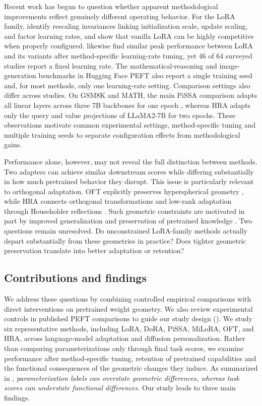 Recent work has begun to question whether apparent methodological improvements
reflect genuinely different operating behavior.
For the LoRA family, \citet{schulman2025lora} identify rescaling invariances
linking initialization scale, update scaling, and factor learning rates, and
show that vanilla LoRA can be highly competitive when properly configured.
\citet{lee2026learningrate} likewise find similar peak performance between
LoRA and its variants after method-specific learning-rate tuning, yet 46 of
64 surveyed studies report a fixed learning rate.
The mathematical-reasoning and image-generation benchmarks in Hugging Face PEFT
\citep[v0.21.0]{mangrulkar2022peft} also report a single training seed and,
for most methods, only one learning-rate setting.
Comparison settings also differ across studies. On GSM8K and MATH, the
main PiSSA comparison adapts all linear layers across three 7B backbones for one
epoch \citep{meng2024pissa}, whereas HRA \citep{yuan2024hra} adapts only
the query and value projections of LLaMA2-7B for two epochs.
These observations motivate common experimental settings, method-specific
tuning and multiple training seeds to separate configuration effects from
methodological gains.

Performance alone, however, may not reveal the full distinction between methods.
Two adapters can achieve similar downstream scores while differing substantially
in how much pretrained behavior they disrupt.
This issue is particularly relevant to orthogonal adaptation.
OFT explicitly preserves hyperspherical geometry
\citep{qiu2023oft}, while HRA connects orthogonal transformations and
low-rank adaptation through Householder reflections \citep{yuan2024hra}.
Such geometric constraints are motivated in part by improved generalization
and preservation of pretrained knowledge
\citep{qiu2023oft,yuan2024hra,huang2026peftarena}.
Two questions remain unresolved.
Do unconstrained LoRA-family methods actually depart substantially from these
geometries in practice? Does tighter geometric preservation translate into
better adaptation or retention?



\subsection{Contributions and findings}

We address these questions by combining controlled empirical comparisons with
direct interventions on pretrained weight geometry.
We also review experimental controls in published PEFT comparisons to guide our study design ().
We study six representative methods, including LoRA, DoRA, PiSSA, MiLoRA, OFT, and
HRA, across language-model adaptation and diffusion personalization.
Rather than comparing parameterizations only through final task scores, we
examine performance after method-specific tuning, retention of pretrained
capabilities and the functional consequences of the geometric changes they induce.
As summarized in ,
\emph{parameterization labels can overstate geometric differences, whereas
task scores can understate functional differences.}
Our study leads to three main findings.

